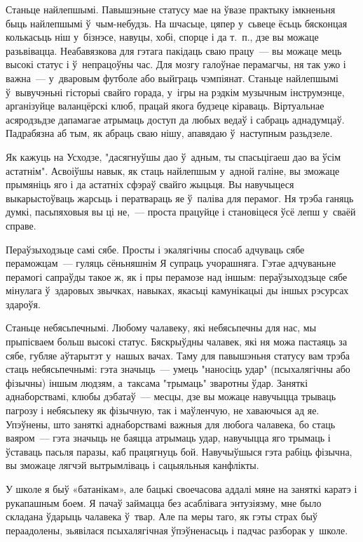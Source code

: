 Станьце найлепшымі. Павышэньне статусу мае на ўвазе практыку імкненьня быць найлепшымі ў~чым-небудзь. На шчасьце, цяпер у~сьвеце ёсьць бясконцая колькасьць ніш у~бізнэсе, навуцы, хобі, спорце і да т.~п., дзе вы можаце разьвівацца. Неабавязкова для гэтага пакідаць сваю працу~--- вы можаце мець высокі статус і ў~непрацоўны час. Для мозгу галоўнае перамагчы, ня так ужо і важна~--- у~дваровым футболе або выйграць чэмпіянат. Станьце найлепшымі ў~вывучэньні гісторыі свайго горада, у~ігры на рэдкім музычным інструмэнце, арганізуйце валанцёрскі клюб, працай якога будзеце кіраваць. Віртуальнае асяродзьдзе дапамагае атрымаць доступ да любых ведаў і сабраць аднадумцаў. Падрабязна аб тым, як абраць сваю нішу, апавядаю ў~наступным разьдзеле.

Як кажуць на Усходзе, "дасягнуўшы дао ў~адным, ты спасьцігаеш дао ва ўсім астатнім". Асвоіўшы навык, як стаць найлепшым у~адной галіне, вы зможаце прымяніць яго і да астатніх сфэраў свайго жыцьця. Вы навучыцеся выкарыстоўваць жарсьць і ператвараць яе ў~паліва для перамог. Ня трэба ганяць думкі, пасьпяховыя вы ці не,~--- проста працуйце і становіцеся ўсё лепш у~сваёй справе.

Пераўзыходзьце самі сябе. Просты і экалягічны спосаб адчуваць сябе пераможцам~--- гуляць сёньняшнім Я супраць учорашняга. Гэтае адчуваньне перамогі сапраўды такое ж, як і пры перамозе над іншым: пераўзыходзьце сябе мінулага ў~здаровых звычках, навыках, якасьці камунікацыі ды іншых рэсурсах здароўя.

Станьце небясьпечнымі. Любому чалавеку, які небясьпечны для нас, мы прыпісваем больш высокі статус. Бяскрыўдны чалавек, які ня можа пастаяць за сябе, губляе аўтарытэт у~нашых вачах. Таму для павышэньня статусу вам трэба стаць небясьпечнымі: гэта значыць~--- умець "наносіць удар" (псыхалягічны або фізычны) іншым людзям, а~таксама "трымаць" зваротны ўдар. Заняткі аднаборствамі, клюбы дэбатаў~--- месцы, дзе вы можаце навучыцца трываць пагрозу і небясьпеку як фізычную, так і маўленчую, не хаваючыся ад яе. Упэўнены, што заняткі аднаборствамі важныя для любога чалавека, бо стаць ваяром~--- гэта значыць не баяцца атрымаць удар, навучыцца яго трымаць і ўставаць пасьля паразы, каб працягнуць бой. Навучыўшыся гэта рабіць фізычна, вы зможаце лягчэй вытрымліваць і сацыяльныя канфлікты.

У школе я быў «батанікам», але бацькі своечасова аддалі мяне на заняткі каратэ і рукапашным боем. Я пачаў займацца без асаблівага энтузіязму, мне было складана ўдарыць чалавека ў~твар. Але па меры таго, як гэты страх быў пераадолены, зьявілася псыхалягічная ўпэўненасьць і падчас разборак у~школе.

